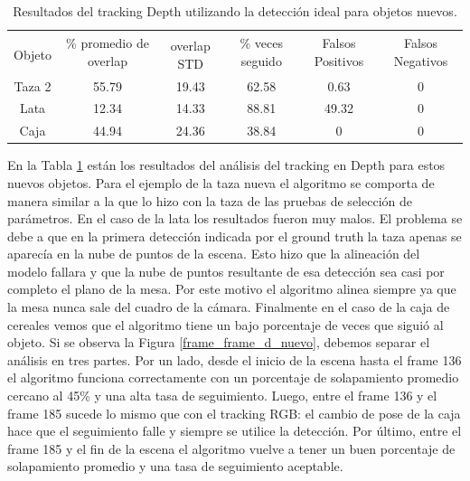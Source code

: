 \begin{table}[h]
    \begin{tabular}{|c|c|c|c|c|c|}
    \hline
    & \multirow{2}{2.4cm}{\% promedio de overlap} & & \multirow{2}{2cm}{\% veces seguido} & \multirow{2}{1.6cm}{Falsos Positivos} & \multirow{2}{1.6cm}{Falsos Negativos}\\
	Objeto & & overlap STD & & &\\
    \hline
    Taza 2  & 55.79      & 19.43       & 62.58             & 0.63             & 0\\
    \hline
    Lata    & 12.34      & 14.33       & 88.81             & 49.32            & 0\\
    \hline
    Caja    & 44.94      & 24.36       & 38.84             & 0                & 0\\
    \hline
    \end{tabular}
\caption{Resultados del tracking Depth utilizando la detección ideal para objetos nuevos.}
\label{tabla_d_nuevos}
\end{table}

En la Tabla \ref{tabla_d_nuevos} están los resultados del análisis del tracking en Depth para estos nuevos objetos. Para el ejemplo de la taza nueva el algoritmo se comporta de manera similar a la que lo hizo con la taza de las pruebas de selección de parámetros. En el caso de la lata los resultados fueron muy malos. El problema se debe a que en la primera detección indicada por el ground truth la taza apenas se aparecía en la nube de puntos de la escena. Esto hizo que la alineación del modelo fallara y que la nube de puntos resultante de esa detección sea casi por completo el plano de la mesa. Por este motivo el algoritmo alinea siempre ya que la mesa nunca sale del cuadro de la cámara. 
Finalmente en el caso de la caja de cereales vemos que el algoritmo tiene un bajo porcentaje de veces que siguió al objeto. Si se observa la Figura \ref{frame_frame_d_nuevo}, debemos separar el análisis en tres partes. Por un lado, desde el inicio de la escena hasta el frame 136 el algoritmo funciona correctamente con un porcentaje de solapamiento promedio cercano al 45\% y una alta tasa de seguimiento. Luego, entre el frame 136 y el frame 185 sucede lo mismo que con el tracking RGB: el cambio de pose de la caja hace que el seguimiento falle y siempre se utilice la detección. Por último, entre el frame 185 y el fin de la escena el algoritmo vuelve a tener un buen porcentaje de solapamiento promedio y una tasa de seguimiento aceptable.

